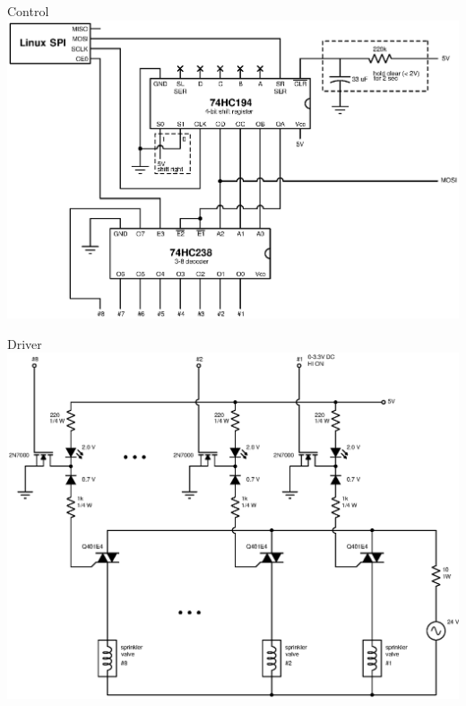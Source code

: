 \documentclass{article}
\begin{document}
\pagebreak

\begin{center}


{\fontsize{20}{20}\selectfont Control} \\
\vspace*{0.2in}
\includegraphics[scale=0.75]{../design/xcircuit/control}

\vspace{0.3in}

{\fontsize{20}{80}\selectfont Driver} \\
\vspace*{0.2in}
\includegraphics[scale=0.7]{../design/xcircuit/driver_mult}


\end{center}
\end{document}
